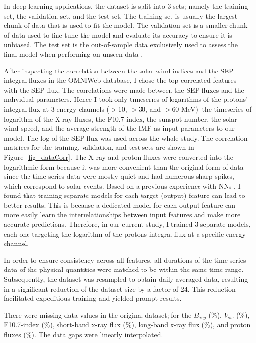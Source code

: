 In deep learning applications, the dataset is split into 3 sets; namely the training set, the validation set, and the test set. The training set is usually the largest chunk of data that is used to fit the model. The validation set is a smaller chunk of data used to fine-tune the model and evaluate its accuracy to ensure it is unbiased. The test set is the out-of-sample data exclusively used to assess the final model when performing on unseen data \citep{ripley_2007}.

After inspecting the correlation between the solar wind indices and the SEP integral fluxes in the OMNIWeb database, I chose the top-correlated features with the SEP flux. The correlations were made between the SEP fluxes and the individual parameters. Hence I took only timeseries of logarithms of the protons' integral flux at 3 energy channels ($>$10, $>$30, and $>$60 MeV), the timeseries of logarithm of the X-ray fluxes, the F10.7 index, the sunspot number, the solar wind speed, and the average strength of the IMF as input parameters to our model.
The log of the SEP flux was used across the whole study.
The correlation matrices for the training, validation, and test sets are shown in Figure~\ref{fig_dataCorr}.
The X-ray and proton fluxes were converted into the logarithmic form because it was more convenient than the original form of data since the time series data were mostly quiet and had numerous sharp spikes, which correspond to solar events.
Based on a previous experience with NNs \citep{mnedal_2019}, I found that training separate models for each target (output) feature can lead to better results. This is because a dedicated model for each  output feature can more easily learn the interrelationships between input features and make more accurate predictions. Therefore, in our current study, I trained 3 separate models, each one targeting the logarithm of the protons integral flux at a specific energy channel.

In order to ensure consistency across all features, all durations of the time series data of the physical quantities were matched to be within the same time range. Subsequently, the dataset was resampled to obtain daily averaged data, resulting in a significant reduction of the dataset size by a factor of 24. This reduction facilitated expeditious training and yielded prompt results.

There were missing data values in the original dataset; for the $B_{avg}$ (\%), $V_{sw}$ (\%), F10.7-index (\%), short-band x-ray flux (\%), long-band x-ray flux (\%), and proton fluxes (\%). The data gaps were linearly interpolated.

